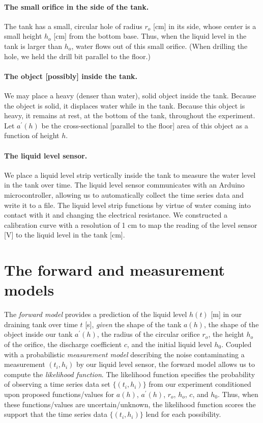\documentclass[openacc]{rsproca_new}%
\begin{document}
\paragraph{The small orifice in the side of the tank.} The tank has a small, circular hole of radius $r_o$ [cm] in its side, whose center is a small height $h_o$ [cm] from the bottom base.
Thus, when the liquid level in the tank is larger than $h_o$, water flows out of this small orifice.
(When drilling the hole, we held the drill bit parallel to the floor.) 

\paragraph{The object [possibly] inside the tank.} We may place a heavy (denser than water), solid object inside the tank. Because the object is solid, it displaces water while in the tank. Because this object is heavy, it remains at rest, at the bottom of the tank, throughout the experiment. Let $a^\prime(h)$ be the cross-sectional [parallel to the floor] area of this object as a function of height $h$.

\paragraph{The liquid level sensor.} We place a liquid level strip vertically inside the tank to measure the water level in the tank over time. The liquid level sensor communicates with an Arduino microcontroller, allowing us to automatically collect the time series data and write it to a file. The liquid level strip functions by virtue of water coming into contact with it and changing the electrical resistance. 
We constructed a calibration curve with a resolution of 1 cm to map the reading of the level sensor [V] to the liquid level in the tank [cm]. 

\section{The forward and measurement models}
The \emph{forward model} provides a prediction of the liquid level $h(t)$ [m] in our draining tank over time $t$ [s], \emph{given} the shape of the tank $a(h)$, the shape of the object inside our tank $a^\prime(h)$, the radius of the circular orifice $r_o$, the height $h_o$ of the orifice, the discharge coefficient $c$, and the initial liquid level $h_0$. 
Coupled with a probabilistic \emph{measurement model} describing the noise contaminating a measurement $(t_i, h_i)$ by our liquid level sensor, the forward model allows us to compute the \emph{likelihood function}. The likelihood function specifies the probability of observing a time series data set $\{(t_i, h_i)\}$ from our experiment conditioned upon proposed functions/values for $a(h)$, $a^\prime(h)$, $r_o$, $h_o$, $c$, and $h_0$. Thus, when these functions/values are uncertain/unknown, the likelihood function scores the support that the time series data $\{(t_i, h_i)\}$ lend for each possibility.
\end{document}
